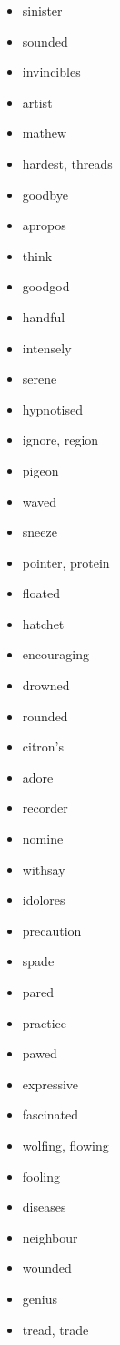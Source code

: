 \documentclass{article}
\begin{document}
\begin{itemize}
    \item sinister
    \item sounded
    \item invincibles
    \item artist
    \item mathew
    \item hardest, threads
    \item goodbye
    \item apropos
    \item think
    \item goodgod
    \item handful
    \item intensely
    \item serene
    \item hypnotised
    \item ignore, region
    \item pigeon
    \item waved
    \item sneeze
    \item pointer, protein
    \item floated
    \item hatchet
    \item encouraging
    \item drowned
    \item rounded
    \item citron's
    \item adore
    \item recorder
    \item nomine
    \item withsay
    \item idolores
    \item precaution
    \item spade
    \item pared
    \item practice
    \item pawed
    \item expressive
    \item fascinated
    \item wolfing, flowing
    \item fooling
    \item diseases
    \item neighbour
    \item wounded
    \item genius
    \item tread, trade

\end{itemize}
\end{document}
